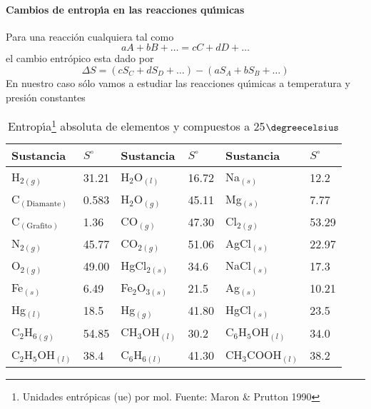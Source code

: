 \paragraph{Cambios de entrop\'{\i}a en las reacciones qu\'{\i}micas}
Para una reacci\'on cual\-quie\-ra tal como
\begin{equation}
aA +bB +\ldots = cC + dD + \ldots
\end{equation}
el cambio entr\'opico esta dado por
\begin{equation}
\Delta S = (cS_C + dS_D + \ldots) - (aS_A + bS_B + \ldots)
\end{equation}
En nuestro caso s\'olo vamos a estudiar las reacciones qu\'{\i}micas a tem\-pe\-ratura y presi\'on constantes

\begin{table} [ht]
\begin{minipage}{\linewidth}
\caption[Entrop\'{\i}a absoluta]{Entrop\'{\i}a\footnote{Unidades entr\'opicas (ue) por
mol. Fuente:  Maron \& Prutton 1990} absoluta  de  elementos y compuestos a 25$\degreecelsius$}
\begin{center}
{\small \begin{tabular}{||ll|ll|ll||} \hline
\textbf{Sustancia}&\textbf{$S ^\circ$}&\textbf{Sustancia}&\textbf{$S^\circ$}
&\textbf{Sustancia}&\textbf{$S^\circ$}\\ \hline
 H$_{2(g)}$        & 31.21  & H$_2$O$_{(l)}$  & 16.72 & Na$_{(s)}$  & 12.2 \\ 
 C$_{(\mathrm{Diamante})}$  & 0.583  & H$_2$O$_{(g)}$  & 45.11 & Mg$_{(s)}$  & 7.77 \\ 
 C$_{(\mathrm{Grafito})}$   & 1.36   & CO$_{(g)}$      & 47.30 & Cl$_{2(g)}$ & 53.29\\ 
 N$_{2(g)}$        & 45.77  & CO$_{2(g)}$     & 51.06 & AgCl$_{(s)}$& 22.97\\
 O$_{2(g)}$        & 49.00  & HgCl$_{2(s)}$   & 34.6  & NaCl$_{(s)}$& 17.3 \\
 Fe$_{(s)}$        & 6.49   & Fe$_2$O$_{3(s)}$& 21.5  & Ag$_{(s)}$  & 10.21\\
 Hg$_{(l)}$        & 18.5   & Hg$_{(g)}$      & 41.80 & HgCl$_{(s)}$ & 23.5\\
 C$_2$H$_{6(g)}$   & 54.85  & CH$_3$OH$_{(l)}$& 30.2  & C$_6$H$_5$OH$_{(l)}$& 34.0\\
 C$_2$H$_5$OH$_{(l)}$&38.4  & C$_6$H$_{6(l)}$ & 41.30 & CH$_3$COOH$_{(l)}$&38.2 \\
 \hline 
\end{tabular}}
\label{tab:4}
\end{center}
\end{minipage}
\end{table}

